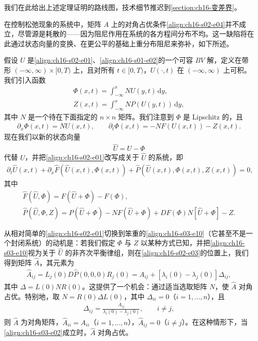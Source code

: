 \documentclass[../../main.tex]{subfiles}
\begin{document}
我们在此给出上述定理证明的路线图，技术细节推迟到\cref{section:ch16-变差界}。

在控制松弛现象的系统中，矩阵 $A$ 上的对角占优条件\eqref{align:ch16-s02-e04}并不成立，尽管源是耗散的——因为阻尼作用在系统的各方程间分布不均。这一缺陷将在此通过状态向量的变换、在更公平的基础上重分布阻尼来弥补，如下所述。

假设 $U$ 是\eqref{align:ch16-s02-e01}、\eqref{align:ch16-s01-e02}的一个可容 $BV$ 解，定义在带形 $(-\infty,\infty)\times[0,T)$ 上，且对所有 $t\in[0,T)$，$U(\cdot,t)$ 在 $(-\infty,\infty)$ 上可积。我们引入函数
\begin{align}
\Phi(x,t)=\int_{-\infty}^x NU(y,t)\,\mathrm{d}y,
\label{align:ch16-s03-e06}\\
Z(x,t)=\int_{-\infty}^x NP(U(y,t))\,\mathrm{d}y,
\label{align:ch16-s03-e07}
\end{align}
其中 $N$ 是一个待在下面指定的 $n\times n$ 矩阵。我们注意到 $\Phi$ 是 Lipschitz 的，且
\begin{align}
\partial_x\Phi(x,t)=NU(x,t),\qquad\partial_t\Phi(x,t)=-NF(U(x,t))-Z(x,t).
\label{align:ch16-s03-e08}
\end{align}
现在我们以新的状态向量
\begin{align}
\hat U=U-\Phi
\label{align:ch16-s03-e09}
\end{align}
代替 $U$，并把\eqref{align:ch16-s02-e01}改写成关于 $\hat U$ 的系统，即
\begin{align}
\partial_t\hat U(x,t)+\partial_x\hat F(\hat U(x,t),\Phi(x,t))+\hat P(\hat U(x,t),\Phi(x,t),Z(x,t))=0,
\label{align:ch16-s03-e10}
\end{align}
其中
\begin{align}
\hat F(\hat U,\Phi)=F(\hat U+\Phi)-F(\Phi),
\label{align:ch16-s03-e11}\\
\hat P(\hat U,\Phi,Z)=P(\hat U+\Phi)-NF(\hat U+\Phi)+DF(\Phi)N[\hat U+\Phi]-Z.
\label{align:ch16-s03-e12}
\end{align}

从相对简单的\eqref{align:ch16-s02-e01}切换到笨重的\eqref{align:ch16-s03-e10}（它甚至不是一个封闭系统）的动机是：若我们假定 $\Phi$ 与 $Z$ 以某种方式已知，并把\eqref{align:ch16-s03-e10}视为关于 $\hat U$ 的非齐次平衡律组，则在\eqref{align:ch16-s02-e03}的位置上，我们得到矩阵 $\hat A$，其元素为
\begin{align}
\hat A_{ij}=L_j(0)D\hat P(0,0,0)R_j(0)=A_{ij}+[\lambda_i(0)-\lambda_j(0)]\Delta_{ij},
\label{align:ch16-s03-e13}
\end{align}
其中 $\Delta=L(0)NR(0)$。这提供了一个机会：通过适当选取矩阵 $N$，使 $\hat A$ 对角占优。特别地，取 $N=R(0)\Delta L(0)$，其中 $\Delta_{ii}=0$（$i=1,\ldots,n$），且
\begin{align}
\Delta_{ij}=\frac{A_{ij}}{\lambda_i(0)-\lambda_j(0)},\qquad i\neq j,
\label{align:ch16-s03-e14}
\end{align}
则 $\hat A$ 为对角矩阵，$\hat A_{ii}=A_{ii}$（$i=1,\ldots,n$），$\hat A_{ij}=0$（$i\neq j$）。在这种情形下，当\eqref{align:ch16-s03-e02}成立时，$\hat A$ 对角占优。
\end{document}
